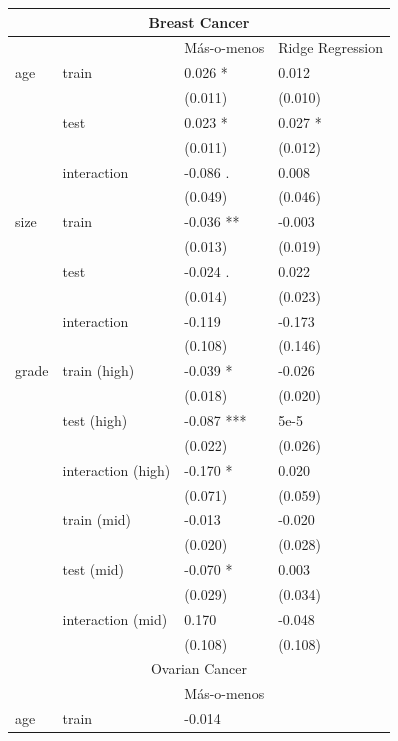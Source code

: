 \documentclass{bioinfo}
\begin{document}
\begin{table}[t]
  \centering
    \begin{tabular}{llll}
    \toprule
    \multicolumn{4}{c}{Breast Cancer} \\
    \midrule
          &       & M\'{a}s-o-menos & Ridge Regression \\
    \hline
    age   & train & 0.026 * & 0.012 \\
          &       & (0.011) & (0.010) \\
          & test  & 0.023 * & 0.027 * \\
          &       & (0.011) & (0.012) \\
          & interaction & -0.086 . & 0.008 \\
          &       & (0.049) & (0.046) \\
    size  & train & -0.036 ** & -0.003 \\
          &       & (0.013) & (0.019) \\
          & test  & -0.024 . & 0.022 \\
          &       & (0.014) & (0.023) \\
          & interaction & -0.119 & -0.173 \\
          &       & (0.108) & (0.146) \\
    grade & train (high) & -0.039 * & -0.026 \\
          &       & (0.018) & (0.020) \\
          & test (high) & -0.087 *** & 5e-5 \\
          &       & (0.022) & (0.026) \\
          & interaction (high) & -0.170 * & 0.020 \\
          &       & (0.071) & (0.059) \\
          & train (mid) & -0.013 & -0.020 \\
          &       & (0.020) & (0.028) \\
          & test (mid) & -0.070 * & 0.003 \\
          &       & (0.029) & (0.034) \\
          & interaction (mid) & 0.170 & -0.048 \\
          &       & (0.108) & (0.108) \\
	\hline    
    \multicolumn{4}{c}{Ovarian Cancer} \\
    \hline
          &       & M\'{a}s-o-menos &  \\
    \hline
    age   & train & -0.014 &  \\

\end{tabular}
\end{table}
\end{document}
